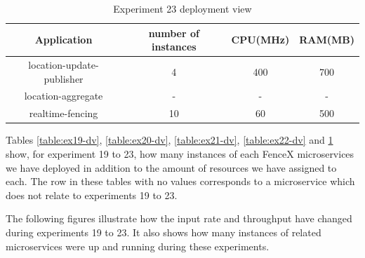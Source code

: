 \documentclass[a4]{report}
\begin{document}
    \begin{table}[h!]
        \centering
        \begin{tabular}{|c|c|c|c|}
            \hline
            Application               & number of instances & CPU(MHz) & RAM(MB) \\
            \hline
            location-update-publisher & 4                   & 400      & 700     \\
            location-aggregate        & -                   & -        & -       \\
            realtime-fencing          & 10                  & 60       & 500     \\
            \hline
        \end{tabular}
        \caption{Experiment 23 deployment view}
        \label{table:ex23-dv}
    \end{table}

    \clearpage

    Tables \ref{table:ex19-dv}, \ref{table:ex20-dv}, \ref{table:ex21-dv}, \ref{table:ex22-dv} and \ref{table:ex23-dv}
    show, for experiment 19 to 23, how many instances of each FenceX microservices we have deployed in addition to
    the amount of resources we have assigned to each.
    The row in these tables with no values corresponds to a microservice which does not relate to experiments 19 to 23.

    The following figures illustrate how the input rate and throughput have changed during experiments 19 to 23.
    It also shows how many instances of related microservices were up and running during these experiments.
\end{document}
